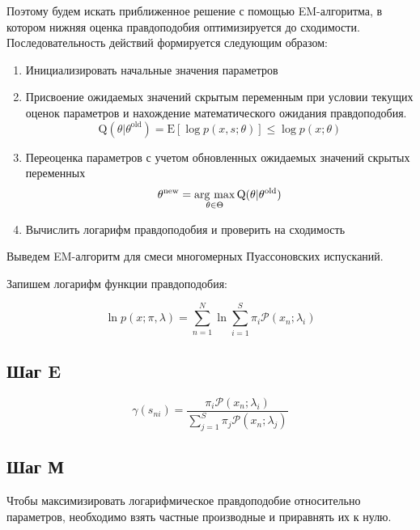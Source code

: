\documentclass{matmex-diploma-custom}
\begin{document}
Поэтому будем искать приближенное решение с помощью EM-алгоритма, в котором нижняя оценка правдоподобия оптимизируется до сходимости. Последовательность действий формируется следующим образом\cite{book:Bishop}:
\begin{enumerate}
\item
Инициализировать начальные значения параметров
\item
Присвоение ожидаемых значений скрытым переменным при условии текущих оценок параметров и нахождение математического ожидания правдоподобия.
$$\mathrm{Q}(\theta|\theta^{\operatorname{old}})
=\mathrm{E}[\log p(x,s;\theta)]\le \log p(x;\theta)$$
\item
Переоценка параметров с учетом обновленных ожидаемых значений скрытых переменных
$$\theta^{\operatorname{new}}=\mathop{\rm arg~max}\limits_{\theta \in \Theta} \mathrm{Q}(\theta|\theta^{\operatorname{old}})$$
\item
Вычислить логарифм правдоподобия и проверить на сходимость
\end{enumerate}

Выведем EM-алгоритм для смеси многомерных Пуассоновских испусканий.

Запишем логарифм функции правдоподобия:

\begin{equation}
\ln p(x;\pi,\lambda) = \sum_{n=1}^N \ln{\sum_{i=1}^S} \pi_i \mathcal{P}(x_n;\lambda_i)
\end{equation}

\subsection*{Шаг E}

\begin{equation}
\gamma(s_{ni}) = \frac{\pi_i\mathcal{P}(x_n;\lambda_i)}{\sum_{j=1}^S\pi_j\mathcal{P}(x_n;\lambda_j)}
\end{equation}

\subsection*{Шаг М}

Чтобы максимизировать логарифмическое правдоподобие относительно параметров, необходимо взять частные производные и приравнять их к нулю.
\end{document}
